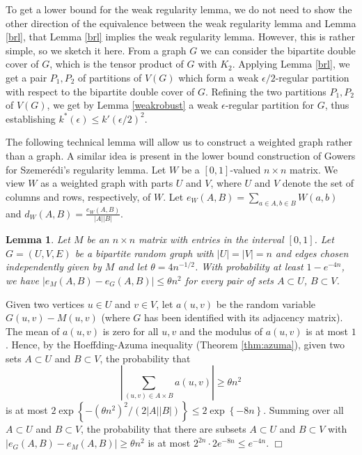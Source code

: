 \documentclass[11pt]{article}
\newtheorem{lemma}{Lemma}[section]
\newenvironment{proof}
      {\medskip\noindent{\bf Proof:}\hspace{1mm}}
      {\hfill$\Box$\medskip}
\begin{document}
To get a lower bound for the weak regularity lemma, we do not need to show the
other direction of the equivalence between the weak regularity lemma and Lemma
\ref{brl}, that Lemma \ref{brl} implies the weak regularity lemma. However,
this is rather simple, so we sketch it here. From a graph $G$ we can consider
the bipartite double cover of $G$, which is the tensor product of $G$ with
$K_2$. Applying Lemma \ref{brl}, we get a pair $P_1,P_2$ of partitions of
$V(G)$ which form a weak $\epsilon/2$-regular partition with respect to the
bipartite double cover of $G$. Refining the two partitions $P_1,P_2$ of $V(G)$,
we get by Lemma \ref{weakrobust} a weak $\epsilon$-regular partition for $G$,
thus establishing $k^*(\epsilon) \leq k'(\epsilon/2)^2$.

The following technical lemma will allow us to construct a weighted graph
rather than a graph. A similar idea is present in the lower bound construction
of Gowers \cite{Go} for Szemer\'edi's regularity lemma. Let $W$ be a
$[0,1]$-valued $n \times n$ matrix. We view $W$ as a weighted graph with parts
$U$ and $V$, where $U$ and $V$ denote the set of columns and rows,
respectively, of $W$. Let $e_W(A,B)=\sum_{a \in A,b \in B} W(a,b)$ and
$d_W(A,B)=\frac{e_W(A,B)}{|A||B|}$.

\begin{lemma}\label{weighthigh}
Let $M$ be an $n \times n$ matrix with entries in the interval $[0,1]$. Let $G=(U,V,E)$ be a bipartite
random graph with $|U|=|V|=n$ and edges chosen independently given by $M$ and
let $\theta=4n^{-1/2}$. With probability at least $1-e^{-4n}$, we have
$|e_M(A,B)-e_G(A,B)| \leq \theta n^2$ for every pair of sets $A \subset U$, $B
\subset V$.
\end{lemma}
\begin{proof}
Given two vertices $u \in U$ and $v \in V$, let $a(u,v)$ be the random variable
$G(u,v) - M (u,v)$ (where $G$ has been identified with its adjacency matrix).
The mean of $a(u,v)$ is zero for all $u,v$ and the modulus of $a(u,v)$ is at
most $1$. Hence, by the Hoeffding-Azuma inequality (Theorem \ref{thm:azuma}),
given two sets $A \subset U$ and $B \subset V$, the probability that
$$\left | \sum_{(u,v) \in A \times B} a(u,v) \right | \geq \theta n^2$$
is at most $2\exp \left \{ -(\theta n^2)^2/(2|A||B|) \right \} \leq 2\exp \left
\{ -8n \right \}$. Summing over all $A \subset U$ and $B \subset V$, the
probability that there are subsets $A \subset U$ and $B \subset V$ with
$|e_G(A,B)-e_M(A,B)| \geq \theta n^2$ is at most $2^{2n}\cdot 2e^{-8n} \leq
e^{-4n}$.
\end{proof}
\end{document}
